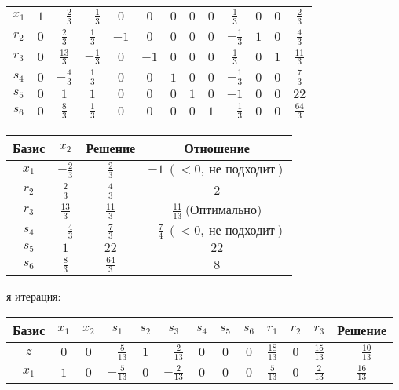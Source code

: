 \documentclass{article}%
\begin{document}
\begin{flushleft}
\begin{tabular}{|c|ccccccccccc|c|}
\hline%
$x_{1}$&$1$&$-\frac{2}{3}$&$-\frac{1}{3}$&$0$&$0$&$0$&$0$&$0$&$\frac{1}{3}$&$0$&$0$&$\frac{2}{3}$\\%
$r_{2}$&$0$&$\frac{2}{3}$&$\frac{1}{3}$&$-1$&$0$&$0$&$0$&$0$&$-\frac{1}{3}$&$1$&$0$&$\frac{4}{3}$\\%
$r_{3}$&$0$&$\frac{13}{3}$&$-\frac{1}{3}$&$0$&$-1$&$0$&$0$&$0$&$\frac{1}{3}$&$0$&$1$&$\frac{11}{3}$\\%
$s_{4}$&$0$&$-\frac{4}{3}$&$\frac{1}{3}$&$0$&$0$&$1$&$0$&$0$&$-\frac{1}{3}$&$0$&$0$&$\frac{7}{3}$\\%
$s_{5}$&$0$&$1$&$1$&$0$&$0$&$0$&$1$&$0$&$-1$&$0$&$0$&$22$\\%
$s_{6}$&$0$&$\frac{8}{3}$&$\frac{1}{3}$&$0$&$0$&$0$&$0$&$1$&$-\frac{1}{3}$&$0$&$0$&$\frac{64}{3}$\\%
\hline%
\end{tabular}%
\newline%
\newline%
\newline%
\begin{tabular}{|cccc|}%
\hline%
Базис&$x_{2}$&Решение&Отношение\\%
\hline%
$x_{1}$&$-\frac{2}{3}$&$\frac{2}{3}$&$-1\: (< 0, \: \text{не подходит})$\\%
$r_{2}$&$\frac{2}{3}$&$\frac{4}{3}$&$2$\\%
$r_{3}$&$\frac{13}{3}$&$\frac{11}{3}$&$\frac{11}{13}\: \text{(Оптимально)}$\\%
$s_{4}$&$-\frac{4}{3}$&$\frac{7}{3}$&$-\frac{7}{4}\: (< 0, \: \text{не подходит})$\\%
$s_{5}$&$1$&$22$&$22$\\%
$s_{6}$&$\frac{8}{3}$&$\frac{64}{3}$&$8$\\%
\hline%
\end{tabular}%
\newline%
\newline%
я итерация: %
\newline%
\newline%
\renewcommand{\arraystretch}{1.3}%
\begin{tabular}{|c|ccccccccccc|c|}%
\hline%
Базис&$x_{1}$&$x_{2}$&$s_{1}$&$s_{2}$&$s_{3}$&$s_{4}$&$s_{5}$&$s_{6}$&$r_{1}$&$r_{2}$&$r_{3}$&Решение\\%
\hline%
$z$&$0$&$0$&$-\frac{5}{13}$&$1$&$-\frac{2}{13}$&$0$&$0$&$0$&$\frac{18}{13}$&$0$&$\frac{15}{13}$&$-\frac{10}{13}$\\%
\hline%
$x_{1}$&$1$&$0$&$-\frac{5}{13}$&$0$&$-\frac{2}{13}$&$0$&$0$&$0$&$\frac{5}{13}$&$0$&$\frac{2}{13}$&$\frac{16}{13}$\\%

\end{tabular}
\end{flushleft}
\end{document}
